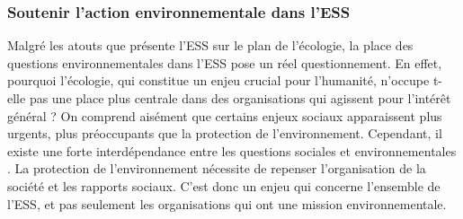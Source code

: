         \subsubsection{Soutenir l'action environnementale dans l'ESS}
        Malgré les atouts que présente l'ESS sur le plan de l'écologie, la place des questions environnementales dans l'ESS pose un réel questionnement. En effet, pourquoi l'écologie, qui constitue un enjeu crucial pour l'humanité, n'occupe t-elle pas une place plus centrale dans des organisations qui agissent pour l'intérêt général ? On comprend aisément que certains enjeux sociaux apparaissent plus urgents, plus préoccupants que la protection de l'environnement. Cependant, il existe une forte interdépendance entre les questions sociales et environnementales \parencite[voir par exemple][]{bodin2019improving, reuveny2007climate}. La protection de l'environnement nécessite de repenser l'organisation de la société et les rapports sociaux. C'est donc un enjeu qui concerne l'ensemble de l'ESS, et pas seulement les organisations qui ont une mission environnementale. \\

